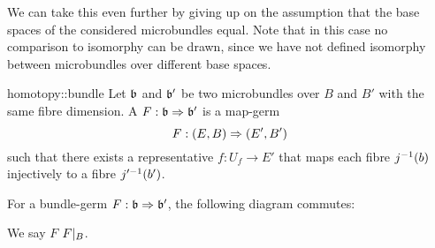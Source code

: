 \begin{myparagraph}
    We can take this even further by giving up on the assumption that the base spaces of the considered microbundles equal.
    Note that in this case no comparison to isomorphy can be drawn,
    since we have not defined isomorphy between microbundles over different base spaces.
\end{myparagraph}

\begin{mydefinition}{homotopy::bundle}{}
    Let $\mathfrak{b}$ and $\mathfrak{b}'$ be two microbundles over $B$ and $B'$ with the same fibre dimension.
    A  $F: \mathfrak{b} \Rightarrow{} \mathfrak{b}'$ is a map-germ
    \[ F: (E, B) \Rightarrow{} (E', B') \]
    such that there exists a representative $f: U_f \to E'$ that maps each fibre $j^{-1}(b)$ injectively to a fibre $j'^{-1}(b')$.
\end{mydefinition}

\begin{myparagraph}
    For a bundle-germ $F: \mathfrak{b} \Rightarrow{} \mathfrak{b}'$, the following diagram commutes:
    \begin{center}
    \end{center}
    We say $F$  $F\vert_{B}$.
\end{myparagraph}